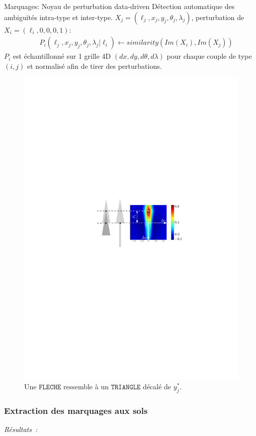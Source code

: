 \documentclass{beamer}
\begin{document}
\begin{frame}{Marquages: Noyau de perturbation data-driven}
Détection automatique des ambiguïtés intra-type et inter-type.
$X_j=(\ell_j,x_j,y_j,\theta_j,\lambda_j)$, perturbation de $X_i=(\ell_i,0,0,0,1)$:
\begin{eqnarray}
\nonumber && P_i(\ell_j,x_j,y_j,\theta_j,\lambda_j | \ell_i) \leftarrow similarity(Im(X_i),Im(X_j))
\end{eqnarray} 
$P_i$ est échantillonné sur 1 grille 4D $(dx,dy,d\theta,d\lambda)$ pour chaque couple de type $(i,j)$ et normalisé afin de tirer des perturbations. 
\begin{figure}
\centering
\includegraphics[width = 0.7\linewidth]{correlation_f_t}
\caption{Une $\texttt{FLECHE}$ ressemble à un $\texttt{TRIANGLE}$ décalé de $y_j^*$.}
\end{figure}
\end{frame}

\begin{frame}
\frametitle{Extraction des marquages aux sols}
\emph{R\'esultats~:}
\begin{center}
\begin{figure}[ht]
\end{figure}
\end{center}
\end{frame}
\end{document}
